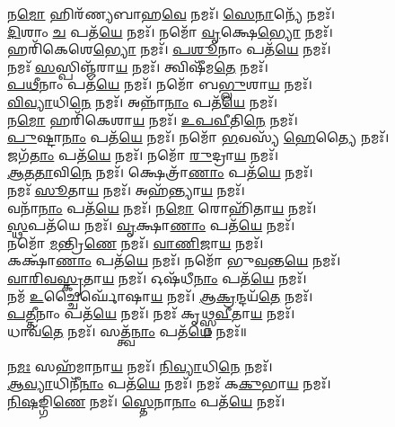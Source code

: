 𑌨\-\ul{𑌮𑍋} 𑌹𑌿𑌰᳴𑌣𑍍𑌯𑌬𑌾𑌹\-\ul{𑌵𑍇} 𑌨𑌮𑌃᳴। \ul{𑌸𑍇}\-\-\ul{𑌨𑌾}\-𑌨𑍍𑌯𑍇᳴  𑌨𑌮𑌃᳴। \\
\-\ul{𑌦𑌿}\-𑌶𑌾𑌂 \ul{𑌚} 𑌪𑌤᳴\-\ul{𑌯𑍇} 𑌨𑌮𑌃᳴। 𑌨𑌮𑍋᳴ \ul{𑌵𑍃}\-𑌕𑍍𑌷𑍇\-\ul{𑌭𑍍𑌯𑍋} 𑌨𑌮𑌃᳴। \\
𑌹𑌰𑌿᳴𑌕𑍇𑌶𑍇\-\ul{𑌭𑍍𑌯𑍋}  𑌨𑌮𑌃᳴। \ul{𑌪}\-\-\ul{𑌶𑍂}\-𑌨𑌾𑌂 𑌪𑌤᳴\-\ul{𑌯𑍇}  𑌨𑌮𑌃᳴। \\
𑌨𑌮𑌃᳴ \ul{𑌸}\-𑌸𑍍𑌪𑌿𑌞𑍍𑌜᳴𑌰𑌾\-\ul{𑌯} 𑌨𑌮𑌃᳴। 𑌤𑍍𑌵𑌿𑌷𑍀᳴𑌮\-\ul{𑌤𑍇} 𑌨𑌮𑌃᳴। \\
\-\ul{𑌪}\-\-\ul{𑌥𑍀}\-𑌨𑌾𑌂 𑌪𑌤᳴\-\ul{𑌯𑍇} 𑌨𑌮𑌃᳴। 𑌨𑌮𑍋᳴ 𑌬\-\ul{𑌭𑍍𑌲𑍁}\-𑌶𑌾\-\ul{𑌯} 𑌨𑌮𑌃᳴। \\
\-\ul{𑌵𑌿}\-\-\ul{𑌵𑍍𑌯𑌾}\-𑌧𑌿\-\ul{𑌨𑍇} 𑌨𑌮𑌃᳴। 𑌅𑌨𑍍𑌨𑌾᳴\-\ul{𑌨𑌾𑌂} 𑌪𑌤᳴\-\ul{𑌯𑍇} 𑌨𑌮𑌃᳴।  \\
𑌨\-\ul{𑌮𑍋} 𑌹𑌰𑌿᳴𑌕𑍇𑌶𑌾\-\ul{𑌯} 𑌨𑌮𑌃᳴। \ul{𑌉}\-\-\ul{𑌪}\-\-\ul{𑌵𑍀}\-𑌤𑌿\-\ul{𑌨𑍇} 𑌨𑌮𑌃᳴। \\
\-\ul{𑌪𑍁}\-𑌷𑍍𑌟𑌾\-\ul{𑌨𑌾𑌂} 𑌪𑌤᳴\-\ul{𑌯𑍇} 𑌨𑌮𑌃᳴। 𑌨𑌮𑍋᳴ \ul{𑌭}\-𑌵𑌸𑍍𑌯᳴ \ul{𑌹𑍇}\-𑌤𑍍𑌯𑍈 𑌨𑌮𑌃᳴। \\
𑌜𑌗᳴\-\ul{𑌤𑌾𑌂} 𑌪𑌤᳴\-\ul{𑌯𑍇} 𑌨𑌮𑌃᳴। 𑌨𑌮𑍋᳴ \ul{𑌰𑍁}\-𑌦𑍍𑌰𑌾\-\ul{𑌯} 𑌨𑌮𑌃᳴। \\
\-\ul{𑌆}\-\-\ul{𑌤}\-\-\ul{𑌤𑌾}\-𑌵𑌿\-\ul{𑌨𑍇} 𑌨𑌮𑌃᳴। 𑌕𑍍𑌷𑍇𑌤𑍍𑌰𑌾᳴\-\ul{𑌣𑌾𑌂} 𑌪𑌤᳴\-\ul{𑌯𑍇} 𑌨𑌮𑌃᳴।  \\
𑌨𑌮𑌃᳴ \ul{𑌸𑍂}\-𑌤𑌾\-\ul{𑌯} 𑌨𑌮𑌃᳴। 𑌅𑌹᳴𑌨𑍍𑌤𑍍𑌯𑌾\-\ul{𑌯} 𑌨𑌮𑌃᳴। \\
𑌵𑌨𑌾᳴\-\ul{𑌨𑌾𑌂}  𑌪𑌤᳴\-\ul{𑌯𑍇} 𑌨𑌮𑌃᳴। 𑌨\-\ul{𑌮𑍋} 𑌰𑍋𑌹𑌿᳴𑌤𑌾\-\ul{𑌯} 𑌨𑌮𑌃᳴। \\
\-\ul{𑌸𑍍𑌥}\-𑌪𑌤᳴𑌯𑍇 𑌨𑌮𑌃᳴। \ul{𑌵𑍃}\-𑌕𑍍𑌷𑌾\-\ul{𑌣𑌾𑌂} 𑌪𑌤᳴\-\ul{𑌯𑍇} 𑌨𑌮𑌃᳴। \\
𑌨𑌮𑍋᳴ \ul{𑌮}\-𑌨𑍍𑌤𑍍𑌰𑌿\-\ul{𑌣𑍇} 𑌨𑌮𑌃᳴। \ul{𑌵𑌾}\-\-\ul{𑌣𑌿}\-𑌜𑌾\-\ul{𑌯} 𑌨𑌮𑌃᳴। \\
𑌕𑌕𑍍𑌷𑌾᳴\-\ul{𑌣𑌾𑌂} 𑌪𑌤᳴\-\ul{𑌯𑍇} 𑌨𑌮𑌃᳴। 𑌨𑌮𑍋᳴ 𑌭𑍁\-\ul{𑌵}\-𑌨𑍍𑌤\-\ul{𑌯𑍇} 𑌨𑌮𑌃᳴। \\
\-\ul{𑌵𑌾}\-\-\ul{𑌰𑌿}\-\-\ul{𑌵}\-\-\ul{𑌸𑍍𑌕𑍃}\-𑌤𑌾\-\ul{𑌯} 𑌨𑌮𑌃᳴। 𑌓𑌷᳴𑌧𑍀\-\ul{𑌨𑌾𑌂} 𑌪𑌤᳴\-\ul{𑌯𑍇} 𑌨𑌮𑌃᳴। \\
𑌨𑌮᳴ \ul{𑌉}\-𑌚𑍍𑌚𑍈𑌰𑍍𑌘𑍋᳴𑌷𑌾\-\ul{𑌯} 𑌨𑌮𑌃᳴। \ul{𑌆}\-\-\ul{𑌕𑍍𑌰}\-𑌨𑍍𑌦𑌯᳴\-\ul{𑌤𑍇} 𑌨𑌮𑌃᳴। \\
\-\ul{𑌪}\-\-\ul{𑌤𑍍𑌤𑍀}\-𑌨𑌾𑌂 𑌪𑌤᳴\-\ul{𑌯𑍇} 𑌨𑌮𑌃᳴। 𑌨𑌮𑌃᳴ 𑌕𑍃𑌥𑍍𑌸𑍍𑌨\-\ul{𑌵𑍀}\-𑌤𑌾\-\ul{𑌯} 𑌨𑌮𑌃᳴। \\
𑌧𑌾𑌵᳴\-\ul{𑌤𑍇} 𑌨𑌮𑌃᳴। 𑌸𑌤𑍍𑌤𑍍𑌵᳴\-\ul{𑌨𑌾𑌂} 𑌪𑌤᳴\-\ul{𑌯𑍇} 𑌨𑌮𑌃᳴॥\\
\\
𑌨\-\ul{𑌮𑌃} 𑌸𑌹᳴𑌮𑌾𑌨𑌾\-\ul{𑌯} 𑌨𑌮𑌃᳴। \ul{𑌨𑌿}\-\-\ul{𑌵𑍍𑌯𑌾}\-𑌧𑌿\-\ul{𑌨𑍇} 𑌨𑌮𑌃᳴। \\
\-\ul{𑌆}\-\-\ul{𑌵𑍍𑌯𑌾}\-𑌧𑌿𑌨𑍀᳴\-\ul{𑌨𑌾𑌂} 𑌪𑌤᳴\-\ul{𑌯𑍇} 𑌨𑌮𑌃᳴। 𑌨𑌮𑌃᳴ 𑌕\-\ul{𑌕𑍁}\-𑌭𑌾\-\ul{𑌯} 𑌨𑌮𑌃᳴। \\
\-\ul{𑌨𑌿}\-\-\ul{𑌷}\-𑌙𑍍𑌗𑌿\-\ul{𑌣𑍇} 𑌨𑌮𑌃᳴। \ul{𑌸𑍍𑌤𑍇}\-𑌨𑌾\-\ul{𑌨𑌾𑌂} 𑌪𑌤᳴\-\ul{𑌯𑍇} 𑌨𑌮𑌃᳴। \\
